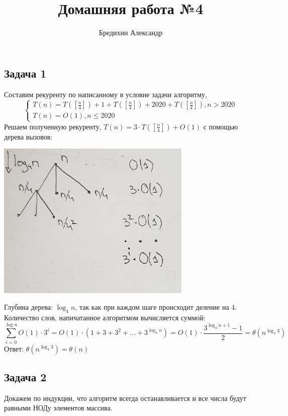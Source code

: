 \documentclass[a4paper,12pt]{article} %
\author{Бредихин Александр}
\title{Домашняя работа №4}
\begin{document}

\maketitle

\subsection*{Задача 1}
Составим рекуренту по написанному в условие задачи алгоритму, 
$$
\left\{\begin{array}{l}
T(n)=T\left(\left[\frac{n}{4}\right]\right)+1+T\left(\left[\frac{n}{4}\right]\right)+2020+T\left(\left[\frac{n}{4}\right]\right), n>2020 \\
T(n)=O(1), n \leq 2020
\end{array}\right.
$$
Решаем полученную рекуренту, $ T(n)=3 \cdot T\left(\left[\frac{n}{4}\right]\right)+O(1) $ с помощью дерева вызовов:
\begin{center}
\includegraphics[width=0.7\textwidth]{tree_1}
\end{center}
Глубина дерева: $ \log_{4}n $, так как при каждом шаге происходит деление на 4. Количество слов, напичатанное алгоритмом вычисляется суммой: 
$$
\sum_{i=0}^{\log n} O(1) \cdot 3^{i}=O(1) \cdot\left(1+3+3^{2}+\ldots+3^{\log_{4} n}\right)=O(1) \cdot \frac{3^{\log _{4} n+1}-1}{2}=\theta\left(n^{\log _{4} 3}\right)
$$
Ответ: $ \theta\left(n^{\log _{4} 3}\right) = \theta(n)  $

\subsection*{Задача 2}
Докажем по индукции, что алгоритм всегда останавливается и  все числа будут равными НОДу элементов массива.\\
\end{document}
